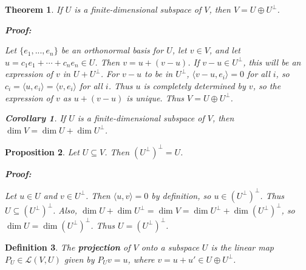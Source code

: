 \documentclass{article}
\theoremstyle{colontheorem}
\newtheorem{theorem}{Theorem}[section]
\newtheorem{proposition}[theorem]{Proposition}
\newtheorem{definition}[theorem]{Definition}
\newtheorem{corollary}{Corollary}[theorem]
\newenvironment{Theorem}
{
	\begin{mdframed}[backgroundcolor=TheoremOrange!10]
	\begin{theorem}
}
{
	\end{theorem}
	\end{mdframed}
	
	\vspace{.15in}
}
\newenvironment{Proposition}
{
	\begin{mdframed}[backgroundcolor=PropPink!10]
	\begin{proposition}
}
{
	\end{proposition}
	\end{mdframed}
	
	\vspace{.15in}
}
\newenvironment{Def}
{
	\begin{mdframed}[backgroundcolor=DefGreen!10]
	\begin{definition}
}
{
	\end{definition}
	\end{mdframed}
	
	\vspace{.15in}
}
\newenvironment{Corollary}
{
	\begin{mdframed}[backgroundcolor=CorollaryBlue!10]
	\begin{corollary}
}
{
	\end{corollary}
	\end{mdframed}
	
	\vspace{.09in}
}
\newenvironment{Proof}
{
	\begin{mdframed}[backgroundcolor=ProofPurple!10]
	\textbf{Proof:}%
}
{
	\end{mdframed}
	
	\vspace{.085in}
}
\begin{document}
\begin{Theorem}
	
	If $U$ is a finite-dimensional subspace of $V$, then $V = U \oplus U^\perp$.
	
	\begin{Proof}
		Let $\{e_1, ..., e_n\}$ be an orthonormal basis for $U$, let $v \in V$, and let $u = c_1 e_1 + \cdots + c_n e_n \in U$. Then $v = u + (v - u)$. If $v - u \in U^\perp$, this will be an expression of $v$ in $U + U^\perp$. For $v - u$ to be in $U^\perp$, $\langle v-u, e_i \rangle = 0$ for all $i$, so $c_i = \langle u, e_i \rangle = \langle v, e_i \rangle$ for all $i$. Thus $u$ is completely determined by $v$, so the expression of $v$ as $u + (v - u)$ is unique. Thus $V = U \oplus U^\perp$.
		
	\end{Proof}
	
	\begin{Corollary}
		
		If $U$ is a finite-dimensional subspace of $V$, then $\dim V = \dim U + \dim U^\perp$.
		
	\end{Corollary}
	
\end{Theorem}



\begin{Proposition}
	
	Let $U \subseteq V$. Then $(U^\perp)^\perp = U$.
	
	\begin{Proof}
		Let $u \in U$ and $v \in U^\perp$. Then $\langle u, v \rangle = 0$ by definition, so $u \in (U^\perp)^\perp$. Thus $U \subseteq (U^\perp)^\perp$. Also, $\dim U + \dim U^\perp = \dim V = \dim U^\perp + \dim (U^\perp)^\perp$, so $\dim U = \dim (U^\perp)^\perp$. Thus $U = (U^\perp)^\perp$.
		
	\end{Proof}
	
\end{Proposition}



\begin{Def}
	
	The \textbf{projection} of $V$ onto a subspace $U$ is the linear map $P_U \in \mathcal{L}(V, U)$ given by $P_U v = u$, where $v = u + u' \in U \oplus U^\perp$.
	
\end{Def}
\end{document}
